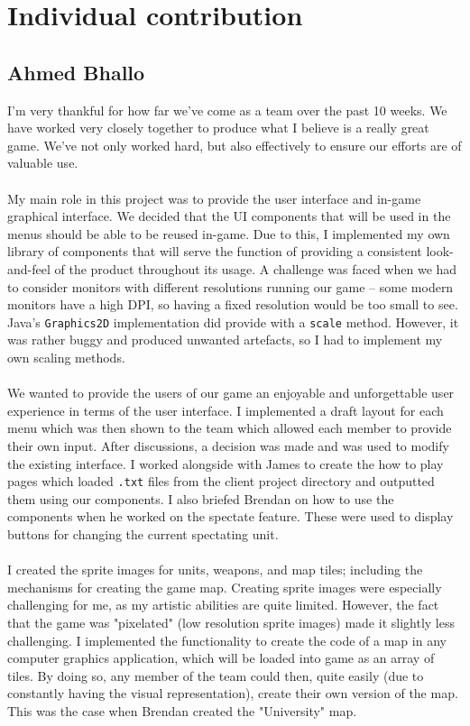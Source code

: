 \documentclass[12pt]{article}
\newcommand{\return}{\\\\\noindent}
\begin{document}
\section{Individual contribution}
\subsection{Ahmed Bhallo}
I'm very thankful for how far we've come as a team over the past 10 weeks. We have worked very closely together to produce what I believe is a really great game. We've not only worked hard, but also effectively to ensure our efforts are of valuable use.\return
My main role in this project was to provide the user interface and in-game graphical interface. We decided that the UI components that will be used in the menus should be able to be reused in-game. Due to this, I implemented my own library of components that will serve the function of providing a consistent look-and-feel of the product throughout its usage. A challenge was faced when we had to consider monitors with different resolutions running our game -- some modern monitors have a high DPI, so having a fixed resolution would be too small to see. Java's \texttt{Graphics2D} implementation did provide with a \texttt{scale} method. However, it was rather buggy and produced unwanted artefacts, so I had to implement my own scaling methods. \return
We wanted to provide the users of our game an enjoyable and unforgettable user experience in terms of the user interface. I implemented a draft layout for each menu which was then shown to the team which allowed each member to provide their own input. After discussions, a decision was made and was used to modify the existing interface. I worked alongside with James to create the how to play pages which loaded \texttt{.txt} files from the client project directory and outputted them using our components. I also briefed Brendan on how to use the components when he worked on the spectate feature. These were used to display buttons for changing the current spectating unit. \return
I created the sprite images for units, weapons, and map tiles; including the mechanisms for creating the game map. Creating sprite images were especially challenging for me, as my artistic abilities are quite limited. However, the fact that the game was "pixelated" (low resolution sprite images) made it slightly less challenging. I implemented the functionality to create the code of a map in any computer graphics application, which will be loaded into game as an array of tiles. By doing so, any member of the team could then, quite easily (due to constantly having the visual representation), create their own version of the map. This was the case when Brendan created the "University" map.\return
\end{document}
